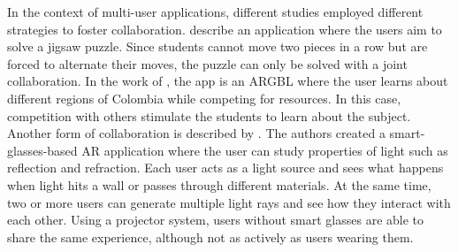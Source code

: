 In the context of multi-user applications, different studies employed different strategies to foster collaboration. \citet{boonbrahm2016interactive} describe an application where the users aim to solve a jigsaw puzzle. Since students cannot move two pieces in a row but are forced to alternate their moves, the puzzle can only be solved with a joint collaboration. In the work of  \citet{ortiz2018evaluation}, the app is an \gls{ARGBL} where the user learns about different regions of Colombia while competing for resources. In this case, competition with others stimulate the students to learn about the subject. Another form of collaboration is described by \citet{oh2016designing}. The authors created a smart-glasses-based AR application where the user can study properties of light such as reflection and refraction. Each user acts as a light source and sees what happens when light hits a wall or passes through different materials. At the same time, two or more users can generate multiple light rays and see how they interact with each other. Using a projector system, users without smart glasses are able to share the same experience, although not as actively as users wearing them.
